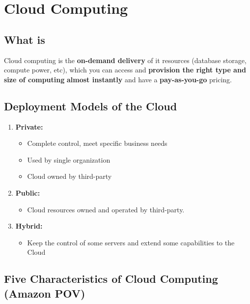 \section{Cloud Computing}\label{sec:cloud-computing}

\subsection{What is}\label{subsec:what-is-cloud-computin}

Cloud computing is the \textbf{on-demand delivery} of it resources (database storage, compute power, etc), which you can access and \textbf{provision the right type and size of computing} \textbf{almost instantly} and have a \textbf{pay-as-you-go} pricing.

\subsection{Deployment Models of the Cloud}\label{subsec:deployment-models-of-the-cloud}

\begin{enumerate}
	\item \textbf{Private:}
	\begin{itemize}
		\item Complete control, meet specific business needs
		\item Used by single organization
		\item Cloud owned by third-party
	\end{itemize}
  	\item \textbf{Public:}
  	\begin{itemize}
  		\item Cloud resources owned and operated by third-party.
  	\end{itemize}
  	\item \textbf{Hybrid:}
  	\begin{itemize}
  		\item Keep the control of some servers and extend  some capabilities to the Cloud
  	\end{itemize}
\end{enumerate}

\subsection{Five Characteristics of Cloud Computing (Amazon POV)}\label{subsec:five-characteristics-of-cloud-computing-(amazon-pov)}

